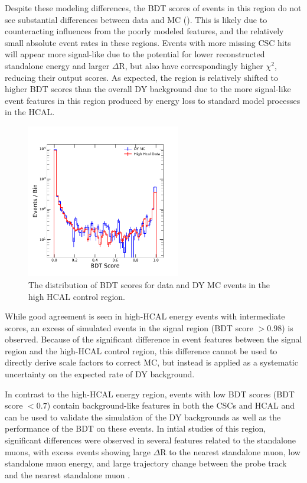 Despite these modeling differences, the BDT scores of events in this region do not see substantial differences between data and MC ().
This is likely due to counteracting influences from the poorly modeled features, and the relatively small absolute event rates in these regions. 
Events with more missing CSC hits will appear more signal-like due to the potential for lower reconstructed standalone energy and larger $\Delta$R, but also have correspondingly higher $\chi^{2}$, reducing their output scores.
As expected, the region is relatively shifted to higher BDT scores than the overall DY background due to the more signal-like event features in this region produced by energy loss to standard model processes in the HCAL. 

\begin{figure}[htbp]
	\label{fig:BDTscorevalid}
	\centering
	\includegraphics[width=0.6\textwidth]{figures/highHcalValid.pdf}
        \caption[BDT Validation in the High HCAL Energy Control Region]{The distribution of BDT scores for data and DY MC events in the high HCAL control region.}
\end{figure}

While good agreement is seen in high-HCAL energy events with intermediate scores, an excess of simulated events in the signal region (BDT score $>$0.98) is observed.
Because of the significant difference in event features between the signal region and the high-HCAL control region, this difference cannot be used to directly derive scale factors to correct MC, but instead is applied as a systematic uncertainty on the expected rate of DY background.

In contrast to the high-HCAL energy region, events with low BDT scores (BDT score $<0.7$) contain background-like features in both the CSCs and HCAL and can be used to validate the simulation of the DY backgrounds as well as the performance of the BDT on these events.
In intial studies of this region, significant differences were observed in several features related to the standalone muons, with excess events showing large $\Delta$R to the nearest standalone muon, low standalone muon energy, and large trajectory change between the probe track and the nearest standalone muon .

